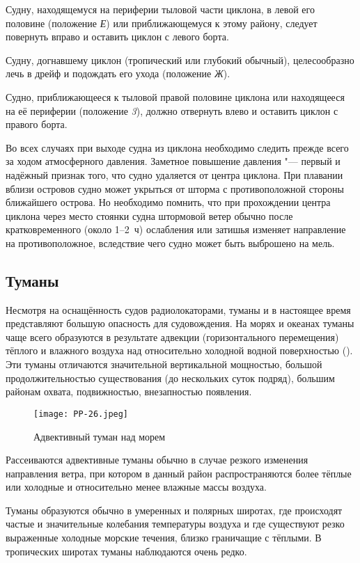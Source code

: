 Судну, находящемуся на периферии тыловой части циклона, в левой его
половине (положение \textit{Е}) или приближающемуся к этому району, следует
повернуть вправо и оставить циклон с левого борта.

Судну, догнавшему циклон (тропический или глубокий обычный),
целесообразно лечь в дрейф и подождать его ухода (положение \textit{Ж}).

Судно, приближающееся к тыловой правой половине циклона или
находящееся на её периферии (положение \textit{3}), должно отвернуть влево и
оставить циклон с правого борта.

Во всех случаях при выходе судна из циклона необходимо следить прежде
всего за ходом атмосферного давления. Заметное повышение давления "---
первый и надёжный признак того, что судно удаляется от центра
циклона. При плавании вблизи островов судно может укрыться от шторма с
противоположной стороны ближайшего острова. Но необходимо помнить, что
при прохождении центра циклона через место стоянки судна штормовой
ветер обычно после кратковременного (около 1--2~ч) ослабления или
затишья изменяет направление на противоположное, вследствие чего
судно может быть выброшено на мель.

\subsection{Туманы}

Несмотря на оснащённость судов радиолокаторами, туманы и в настоящее
время представляют большую опасность для судовождения. На морях и
океанах туманы чаще всего образуются в результате адвекции
(горизонтального перемещения) тёплого и влажного воздуха над
относительно холодной водной поверхностью (). Эти туманы
отличаются значительной вертикальной мощностью, большой
продолжительностью существования (до нескольких суток подряд), большим
районам охвата, подвижностью, внезапностью появления.

\begin{figure}[htb]
  \centering{}
  \texttt{[image: PP-26.jpeg]}
  \caption{Адвективный туман над морем}
  \label{fig:pp26}
  \small
  \centering{}
\end{figure}

Рассеиваются адвективные туманы обычно в случае резкого изменения
направления ветра, при котором в данный район распространяются более
тёплые или холодные и относительно менее влажные массы воздуха.

Туманы образуются обычно в умеренных и полярных широтах, где
происходят частые и значительные колебания температуры воздуха и где
существуют резко выраженные холодные морские течения, близко
граничащие с тёплыми. В тропических широтах туманы наблюдаются очень
редко.


